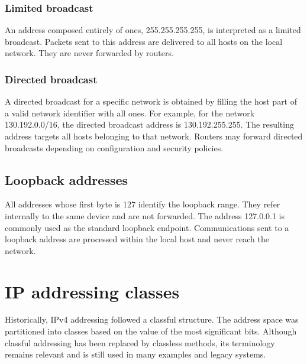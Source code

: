 \subsubsection*{Limited broadcast}

An address composed entirely of ones, 255.255.255.255, is interpreted as a limited broadcast. Packets sent to this address are delivered to all hosts on the local network. They are never forwarded by routers.

\subsubsection*{Directed broadcast}

A directed broadcast for a specific network is obtained by filling the host part of a valid network identifier with all ones. For example, for the network 130.192.0.0/16, the directed broadcast address is 130.192.255.255. The resulting address targets all hosts belonging to that network. Routers may forward directed broadcasts depending on configuration and security policies.

\subsection{Loopback addresses}

All addresses whose first byte is 127 identify the loopback range. They refer internally to the same device and are not forwarded. The address 127.0.0.1 is commonly used as the standard loopback endpoint. Communications sent to a loopback address are processed within the local host and never reach the network.

\section{IP addressing classes}

Historically, IPv4 addressing followed a classful structure. The address space was partitioned into classes based on the value of the most significant bits. Although classful addressing has been replaced by classless methods, its terminology remains relevant and is still used in many examples and legacy systems.

\begin{center}
\end{center}

